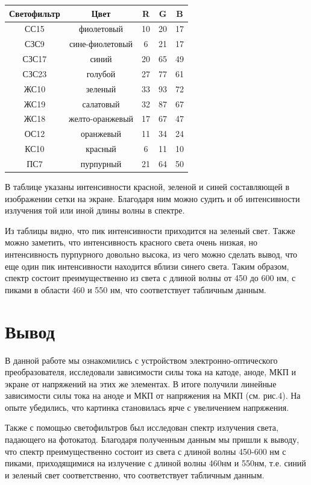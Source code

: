 \begin{table}[t]
\centering
\begin{tabular}{|c|c|c|c|c|}
\hline
Светофильтр & Цвет            & R  & G  & B  \\ \hline
СС15        & фиолетовый      & 10  & 20 & 17 \\ \hline
СЗС9        & сине-фиолетовый & 6  & 21 & 17 \\ \hline
СЗС17       & синий           & 20 & 65 & 49 \\ \hline
СЗС23       & голубой         & 27 & 77 & 61 \\ \hline
ЖС10        & зеленый         & 33 & 93 & 72 \\ \hline
ЖС19        & салатовый       & 32 & 87 & 67 \\ \hline
ЖС18        & желто-оранжевый & 17 & 67 & 47 \\ \hline
ОС12        & оранжевый       & 11 & 34 & 24 \\ \hline
КС10        & красный         & 6  & 11 & 10 \\ \hline
ПС7         & пурпурный       & 21 & 64 & 50 \\ \hline
\end{tabular}
\end{table}

В таблице указаны интенсивности красной, зеленой и синей составляющей в изображении сетки на экране. Благодаря ним можно судить и об интенсивности излучения той или иной длины волны в спектре.

Из таблицы видно, что пик интенсивности приходится на зеленый свет. Также можно заметить, что интенсивность красного света очень низкая, но интенсивность пурпурного довольно высока, из чего можно сделать вывод, что еще один пик интенсивности находится вблизи синего света. Таким образом, спектр состоит преимущественно из света с длиной волны от 450 до 600 нм, с пиками в области 	460 и 550 нм, что соответствует табличным данным.

\section*{Вывод}

В данной работе мы ознакомились с устройством электронно-оптического преобразователя, исследовали зависимости силы тока на катоде, аноде, МКП и экране от напряжений на этих же элементах. В итоге получили линейные зависимости силы тока на аноде и МКП от напряжения на МКП (см. рис.4). На опыте убедились, что картинка становилась ярче с увеличением напряжения.

Также с помощью светофильтров был исследован спектр излучения света, падающего на фотокатод. Благодаря полученным данным мы пришли к выводу, что спектр преимущественно состоит из света с длиной волны 450-600 нм с пиками, приходящимися на излучение с длиной волны 460нм и 550нм, т.е. синий и зеленый свет соответственно, что соответствует табличным данным.



